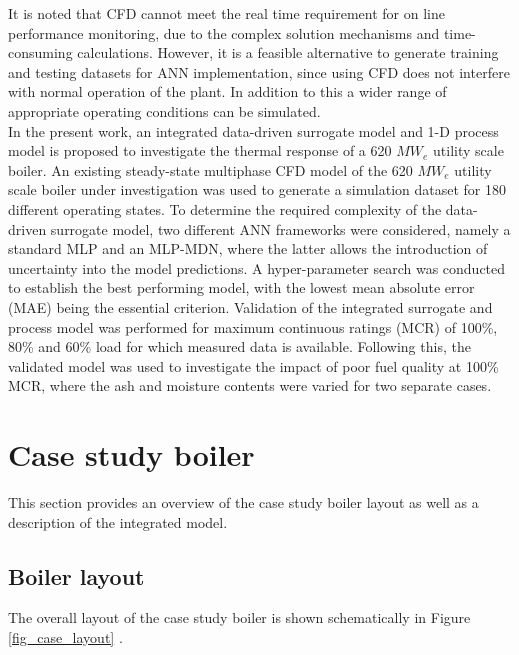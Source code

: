 \documentclass[a4paper,fleqn]{cas-dc}
\begin{document}
It is noted that CFD cannot meet the real time requirement for on line performance monitoring, due to the complex solution mechanisms and time-consuming calculations. However, it is a feasible alternative to generate training and testing datasets for ANN implementation, since using CFD does not interfere with normal operation of the plant. In addition to this a wider range of appropriate operating conditions can be simulated.\\
 
In the present work, an integrated data-driven surrogate model and 1-D process model is proposed to investigate the thermal response of a 620 $MW_e$ utility scale boiler. An existing steady-state multiphase CFD model \cite{Rawlins2021, INFUB2022} of the 620 $MW_e$ utility scale boiler under investigation was used to generate a simulation dataset for 180 different operating states. To determine the required complexity of the data-driven surrogate model, two different ANN frameworks were considered, namely a standard MLP and an MLP-MDN, where the latter allows the introduction of uncertainty into the model predictions. A hyper-parameter search was conducted to establish the best performing model, with the lowest mean absolute error (MAE) being the essential criterion. Validation of the integrated surrogate and process model was performed for maximum continuous ratings (MCR) of 100\%, 80\% and 60\% load for which measured data is available. Following this, the validated model was used to investigate the impact of poor fuel quality at 100\% MCR, where the ash and moisture contents were varied for two separate cases.

\section{Case study boiler}
This section provides an overview of the case study boiler layout as well as a description of the integrated model.
\subsection{Boiler layout}
The overall layout of the case study boiler is shown schematically in Figure \ref{fig_case_layout} \cite{Rousseau2020}.
\end{document}
